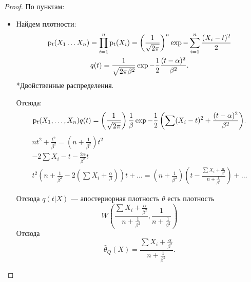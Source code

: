     \begin{proof}
        По пунктам:
        \begin{itemize}
            \item Найдем плотности:
                \begin{gather*}
                    \mathrm{p}_{t}{\left(X_1 \ldots X_n\right)} = \prod_{i = 1}^n \mathrm{p}_{t}{\left(X_i\right)} = \left(\frac{1}{\sqrt{2 \pi}}\right)^n \exp{-\sum_{i = 1}^n \frac{(X_i - t)^2}{2}} \\
                    q(t) = \frac{1}{\sqrt{2 \pi \beta^2}} \exp{-\frac12 \frac{(t - \alpha)^2}{\beta^2}}.
                \end{gather*}
                *Двойственные распределения.

                Отсюда:
                \begin{displaymath}
                \mathrm{p}_{t}{\left(X_1, \ldots ,X_n\right)} q(t) = \left(\frac{1}{\sqrt{2 \pi}}\right) \frac{1}{\beta} \exp{-\frac12 \left(\sum (X_i - t)^2 + \frac{(t - \alpha)^2}{\beta^2}\right)}.
                \end{displaymath}
                \begin{gather*}
                    nt^2 + \frac{t^2}{\beta^2} = \left(n + \frac{1}{\beta^2} \right) t^2 \\
                    -2 \sum X_i - t - \frac{2 \alpha}{\beta^2} t \\
                    t^2 \left(n + \frac1{\beta^2} - 2 \left(\sum X_i + \frac{\alpha}{\beta}\right)\right)t + \ldots
                    = \left(n + \frac1{\beta^2}\right) \left(t - \frac{\sum X_i + \frac{\alpha}{\beta^2}}{n + \frac1{\beta^2}}\right) + \ldots
                \end{gather*}

                Отсюда \(q(t | X)\) --- апостериорная плотность \(\theta\) есть плотность
                \begin{displaymath}
                    W \left(\frac{\sum X_i + \frac{\alpha}{\beta^2}}{n + \frac{1}{\beta^2}}, \frac{1}{n + \frac1{\beta^2}}\right)
                \end{displaymath}
                Отсюда
                \begin{displaymath}
                    \widehat{\theta}_Q(X) = \frac{\sum X_i + \frac{\alpha}{\beta^2}}{n + \frac1{\beta^2}}.
                \end{displaymath}


\end{itemize}
\end{proof}
